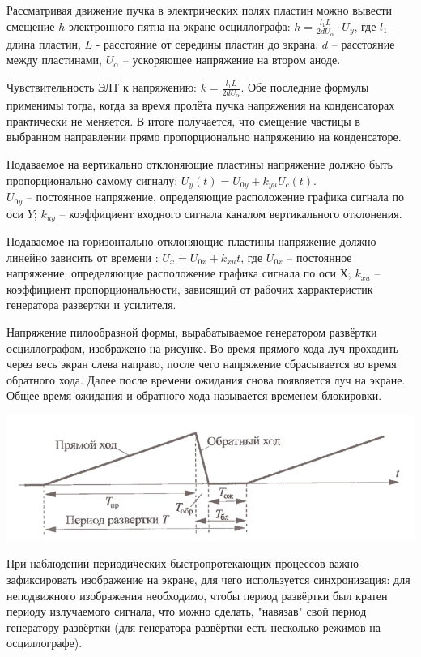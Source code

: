 \documentclass[a4paper, 12pt]{article} %
\begin{document}
Рассматривая движение пучка в электрических полях пластин можно вывести смещение $h$ электронного пятна на экране осциллографа: ${ h =\frac{l_1L}{2dU_\alpha}\cdot U_y}$, где ${ l_1}$ -- длина пластин, ${ L}$ - расстояние от середины пластин до экрана, $d$ -- расстояние между пластинами, ${ U_\alpha} $ -- ускоряющее напряжение на втором аноде.

Чувствительность ЭЛТ к напряжению: ${ k =\frac{l_1L}{2dU_\alpha}}$. Обе последние формулы применимы тогда, когда за время пролёта пучка напряжения на конденсаторах практически не меняется. В итоге получается, что смещение частицы в выбранном направлении прямо пропорционально напряжению на конденсаторе.


Подаваемое на вертикально отклоняющие пластины напряжение должно быть пропорционально самому сигналу:  ${ U_y(t) = U_{0y}+k_{yu}U_c(t).}$\\
${ U_{0y}}$ -- постоянное напряжение, определяющие расположение графика сигнала по оси $Y$; ${ k_{uy}}$ -- коэффициент входного сигнала каналом вертикального отклонения.

Подаваемое на горизонтально отклоняющие пластины напряжение должно линейно зависить от времени : ${ U_x = U_{0x}+ k_{xu}t}$, где ${ U_{0x}}$ -- постоянное напряжение, определяющие расположение графика сигнала по оси $Х$; ${ k_{xu}}$ -- коэффициент пропорциональности, зависящий от рабочих харрактеристик генератора развертки и усилителя.

Напряжение пилообразной формы, вырабатываемое генератором развёртки осциллографом, изображено на рисунке. Во время прямого хода луч проходить через весь экран слева направо, после чего напряжение сбрасывается во время обратного хода. Далее после времени ожидания снова появляется луч на экране. Общее время ожидания и обратного хода называется временем блокировки.

\begin{center}
    \includegraphics[width=14cm]{3}
\end{center}

При наблюдении периодических быстропротекающих процессов важно зафиксировать изображение на экране, для чего используется синхронизация: для неподвижного изображения необходимо, чтобы период развёртки был кратен периоду излучаемого сигнала, что можно сделать, "навязав" свой период генератору развёртки (для генератора развёртки есть несколько режимов на осциллографе).
\end{document}
